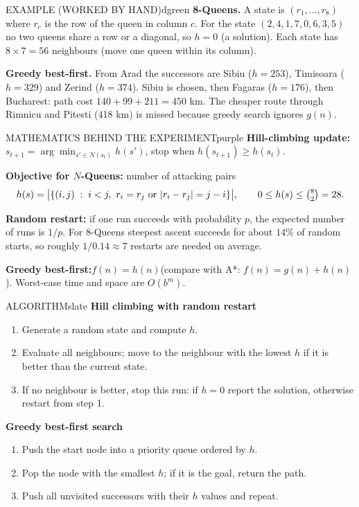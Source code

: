 \documentclass[11pt,a4paper]{article}
\newenvironment{example}{\begin{secbox}{EXAMPLE (WORKED BY HAND)}{dgreen}}{\end{secbox}}
\newenvironment{maths}{\begin{secbox}{MATHEMATICS BEHIND THE EXPERIMENT}{purple}}{\end{secbox}}
\newenvironment{algorithm}{\begin{secbox}{ALGORITHM}{slate}}{\end{secbox}}
\begin{document}
\begin{example}
\textbf{8-Queens.} A state is $(r_1,\dots,r_8)$ where $r_c$ is the row of the queen in column $c$. For the state $(2,4,1,7,0,6,3,5)$ no two queens share a row or a diagonal, so $h=0$ (a solution). Each state has $8\times 7 = 56$ neighbours (move one queen within its column).

\textbf{Greedy best-first.} From Arad the successors are Sibiu ($h=253$), Timisoara ($h=329$) and Zerind ($h=374$). Sibiu is chosen, then Fagaras ($h=176$), then Bucharest: path cost $140+99+211=450$ km. The cheaper route through Rimnicu and Pitesti (418 km) is missed because greedy search ignores $g(n)$.
\end{example}

\begin{maths}
\textbf{Hill-climbing update:}\quad $s_{t+1} = \arg\min_{s'\in N(s_t)} h(s')$, stop when $h(s_{t+1}) \ge h(s_t)$.

\textbf{Objective for $N$-Queens:} number of attacking pairs
\[ h(s) = \bigl|\{(i,j)\;:\; i<j,\ r_i = r_j \ \text{or}\ |r_i-r_j| = j-i\}\bigr|, \qquad 0\le h(s)\le \tbinom{8}{2}=28 . \]

\textbf{Random restart:} if one run succeeds with probability $p$, the expected number of runs is $1/p$. For 8-Queens steepest ascent succeeds for about $14\%$ of random starts, so roughly $1/0.14\approx 7$ restarts are needed on average.

\textbf{Greedy best-first:}\quad $f(n) = h(n)$\quad (compare with A*: $f(n)=g(n)+h(n)$). Worst-case time and space are $O(b^{m})$.
\end{maths}

\begin{algorithm}
\textbf{Hill climbing with random restart}
\begin{enumerate}
  \item Generate a random state and compute $h$.
  \item Evaluate all neighbours; move to the neighbour with the lowest $h$ if it is better than the current state.
  \item If no neighbour is better, stop this run: if $h=0$ report the solution, otherwise restart from step 1.
\end{enumerate}
\textbf{Greedy best-first search}
\begin{enumerate}
  \item Push the start node into a priority queue ordered by $h$.
  \item Pop the node with the smallest $h$; if it is the goal, return the path.
  \item Push all unvisited successors with their $h$ values and repeat.
\end{enumerate}
\end{algorithm}
\end{document}
